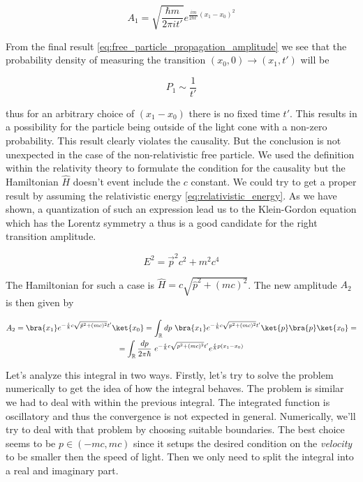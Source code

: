\begin{equation}
    \label{eq:free_particle_propagation_amplitude}
    A_{1} = \sqrt{\frac{\hbar m}{2 \pi i t'}} e^{\frac{im}{2\hbar t'} (x_{1} - x_{0})^{2}}
\end{equation}

From the final result \ref{eq:free_particle_propagation_amplitude} we see that the probability density of measuring the
transition $(x_{0}, 0) \to (x_{1}, t')$ will be

\begin{equation*}
    P_{1} \sim \frac{1}{t'}
\end{equation*}

thus for an arbitrary choice of $(x_{1} - x_{0})$ there is no fixed time $t'$. This results in a possibility for the particle
being outside of the light cone with a non-zero probability. This result clearly violates the causality. But the conclusion is
not unexpected in the case of the non-relativistic free particle. We used the definition within the relativity theory to 
formulate the condition for the causality but the Hamiltonian $\hat{H}$ doesn't event include the $c$ constant. We could try
to get a proper result by assuming the relativistic energy \ref{eq:relativistic_energy}. As we have shown, a quantization of such an
expression lead us to the Klein-Gordon equation which has the Lorentz symmetry a thus is a good candidate for the right transition
amplitude.

\begin{equation}
    \label{eq:relativistic_energy}
    E^{2} = \vec{p}^{2} c^{2} + m^{2} c^{4}
\end{equation}

The Hamiltonian for such a case is $\hat{H} = c\sqrt{\hat{p}^{2} + (mc)^{2}}$. The new amplitude $A_{2}$ is then given by

\begin{equation*}
    \begin{gathered}
        A_{2} = \bra{x_{1}} e^{- \frac{i}{\hbar} c\sqrt{\hat{p}^{2} + (mc)^{2}} t'}\ket{x_{0}} = \int_{\mathbb{R}} dp \ \bra{x_{1}} e^{- \frac{i}{\hbar} c \sqrt{p^{2} + (mc)^{2}} t'} \ket{p} \bra{p} \ket{x_{0}} = \\
        = \int_{\mathbb{R}} \frac{dp}{2 \pi \hbar} \ e^{- \frac{i}{\hbar} c \sqrt{p^{2} + (mc)^{2}} t'} e^{\frac{i}{\hbar}p (x_{1} - x_{0})}
    \end{gathered}
\end{equation*}

Let's analyze this integral in two ways. Firstly, let's try to solve the problem numerically to get the idea of how the integral behaves.
The problem is similar we had to deal with within the previous integral. The integrated function is oscillatory and thus the convergence
is not expected in general. Numerically, we'll try to deal with that problem by choosing suitable boundaries. The best choice seems to be
$p \in (-mc, mc)$ since it setups the desired condition on the \textit{velocity} to be smaller then the speed of light. Then we only need 
to split the integral into a real and imaginary part.


